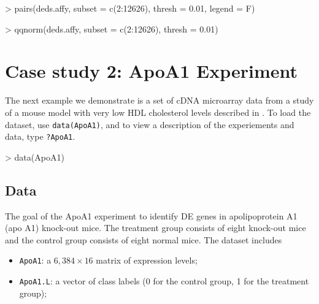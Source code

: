 \documentclass[11pt]{article}
\newcommand{\code}[1]{{\tt #1}}
\newcommand{\myincfig}[3]{%
  \begin{figure}[htbp]
    \begin{center}
      \texttt{[image: \#1]}
      \caption{\label{#1}#3}
    \end{center}
  \end{figure}
}
\begin{document}
\begin{Schunk}
\begin{Sinput}
> pairs(deds.affy, subset = c(2:12626), thresh = 0.01, legend = F)
\end{Sinput}
\end{Schunk}

\begin{Schunk}
\begin{Sinput}
> qqnorm(deds.affy, subset = c(2:12626), thresh = 0.01)
\end{Sinput}
\end{Schunk}


\section{Case study 2: ApoA1 Experiment}
The next example we demonstrate is a set of cDNA microarray data from a study of a
mouse model with very low HDL cholesterol levels described in
\cite{Dudoitetal02}. To load the dataset, use
\code{data(ApoA1)}, and to view a description of the experiements
and data, type \code{?ApoA1}.

\begin{Schunk}
\begin{Sinput}
> data(ApoA1)
\end{Sinput}
\end{Schunk}

\subsection{Data}
The goal of the ApoA1 experiment to identify DE genes in apolipoprotein A1
(apo A1) knock-out mice. The treatment group consists of eight knock-out mice
and the control group consists of eight normal mice. The dataset 
includes 

\begin{itemize}
\item
{\code{ApoA1}:} a $6,384 \times 16 $ matrix of expression levels;
\item
{\code{ApoA1.L}:} a vector of class labels (0 for the control group, 
1 for the treatment group);
\end{itemize}
\end{document}
